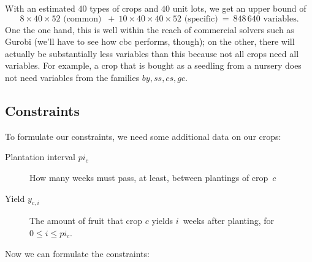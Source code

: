 \documentclass[11pt]{amsart}
\numberwithin{equation}{section}
\begin{document}
With an estimated $40$ types of crops and $40$ unit lots, we get an
upper bound of
\[
   8\times 40\times 52 \text{ (common) }
   \ + \ 
   10\times 40\times 40\times 52 \text{ (specific)}
   \ = \ 
   848\,640 \text{ variables.}
\]
One the one hand, this is well within the reach of commercial solvers
such as Gurobi (we'll have to see how cbc performs, though); on the
other, there will actually be substantially less variables than this
because not all crops need all variables. For example, a crop that is
bought as a seedling from a nursery does not need variables from the
families $by, ss, cs, gc$.

\subsection{Constraints}

To formulate our constraints, we need some additional data on our
crops:
\begin{description}
\item[Plantation interval $pi_{c}$] How many weeks must pass, at
  least, between plantings of crop~$c$ 

\item[Yield $y_{c,i}$] The amount of fruit that crop $c$ yields
  $i$~weeks after planting, for $0\le i\le pi_c$.
\end{description}

Now  we can formulate the constraints:
\end{document}
